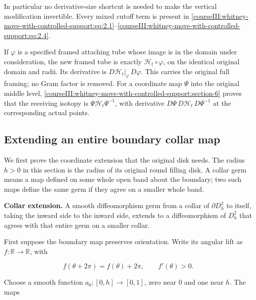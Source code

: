 In particular no derivative-size shortcut is needed to make the vertical modification invertible. Every mixed cutoff term is present in \eqref{courseIII:whitney-move-with-controlled-support:eq:2.1}--\eqref{courseIII:whitney-move-with-controlled-support:eq:2.4}.

If \(\varphi\) is a specified framed attaching tube whose image is in the domain under consideration, the new framed tube is exactly \(\mathcal H_t\circ\varphi\), on the identical original domain and radii. Its derivative is
\(D\mathcal H_t|_{\varphi}\,D\varphi\). This carries the original full framing; no Gram factor is removed. For a coordinate map \(\Psi\) into the original middle level, \cref{courseIII:whitney-move-with-controlled-support:section-6} proves that the receiving isotopy is
\(\Psi\mathcal H_t\Psi^{-1}\), with derivative
\(D\Psi\,D\mathcal H_t\,D\Psi^{-1}\) at the corresponding actual points.

\subsection{Extending an entire boundary collar map}
\label{courseIII:whitney-move-with-controlled-support:move-collar-extension}

\label{courseIII:whitney-move-with-controlled-support:section-3}\label{courseIII:whitney-support:3}

We first prove the coordinate extension that the original disk needs. The radius \(h>0\) in this section is the radius of its original round filling disk. A collar germ means a map defined on some whole open band about the boundary; two such maps define the same germ if they agree on a smaller whole band.

\textbf{Collar extension.} A smooth diffeomorphism germ from a collar of \(\partial D_h^2\) to itself, taking the inward side to the inward side, extends to a diffeomorphism of \(D_h^2\) that agrees with that entire germ on a smaller collar.

First suppose the boundary map preserves orientation. Write its angular lift as \(f:\mathbb R\to\mathbb R\), with

\begin{equation}
f(\theta+2\pi)=f(\theta)+2\pi,\qquad f'(\theta)>0.
\label{courseIII:whitney-move-with-controlled-support:eq:3.1}
\end{equation}

Choose a smooth function \(a_0:[0,h]\to[0,1]\), zero near \(0\) and one near \(h\). The maps

